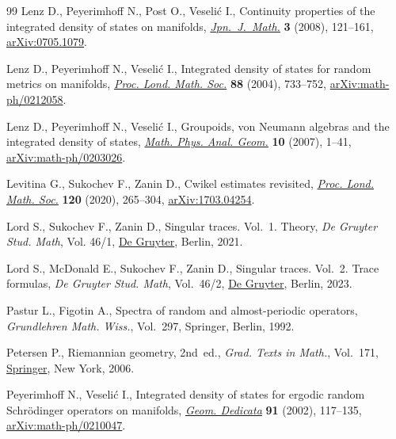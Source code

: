 \documentclass[pdftex]{sigma}
\numberwithin{equation}{section}
\begin{document}
\begin{thebibliography}{99}
Lenz D., Peyerimhoff N., Post O., Veseli\'c I., Continuity properties of the
 integrated density of states on manifolds, \href{https://doi.org/10.1007/s11537-008-0729-4}{\textit{Jpn.~J.~Math.}} \textbf{3}
 (2008), 121--161, \href{https://arxiv.org/abs/0705.1079}{arXiv:0705.1079}.

Lenz D., Peyerimhoff N., Veseli\'c I., Integrated density of states for random
 metrics on manifolds, \href{https://doi.org/10.1112/S0024611503014576}{\textit{Proc. Lond. Math. Soc.}} \textbf{88} (2004),
 733--752, \href{https://arxiv.org/abs/math-ph/0212058}{arXiv:math-ph/0212058}.

Lenz D., Peyerimhoff N., Veseli\'c I., Groupoids, von {N}eumann algebras and
 the integrated density of states, \href{https://doi.org/10.1007/s11040-007-9019-2}{\textit{Math. Phys. Anal. Geom.}}
 \textbf{10} (2007), 1--41, \href{https://arxiv.org/abs/math-ph/0203026}{arXiv:math-ph/0203026}.

Levitina G., Sukochev F., Zanin D., Cwikel estimates revisited, \href{https://doi.org/10.1112/plms.12301}{\textit{Proc.
 Lond. Math. Soc.}} \textbf{120} (2020), 265--304, \href{https://arxiv.org/abs/1703.04254}{arXiv:1703.04254}.

Lord S., Sukochev F., Zanin D., Singular traces. {V}ol.~1. {T}heory, \textit{De
 Gruyter Stud. Math}, Vol. 46/1, \href{https://doi.org/10.1515/9783110378054-201}{De Gruyter}, Berlin, 2021.

Lord S., McDonald E., Sukochev F., Zanin D., Singular traces. {V}ol.~2. {T}race
 formulas, \textit{De Gruyter Stud. Math}, Vol.~46/2, \href{https://doi.org/10.1515/9783110700176}{De Gruyter}, Berlin,
 2023.

Pastur L., Figotin A., Spectra of random and almost-periodic operators,
 \textit{Grundlehren Math. Wiss.}, Vol.~297, Springer, Berlin, 1992.

Petersen P., Riemannian geometry, 2nd~ed., \textit{Grad. Texts in Math.}, Vol.~171, \href{https://doi.org/10.1007/978-0-387-29403-2}{Springer}, New York, 2006.

Peyerimhoff N., Veseli\'c I., Integrated density of states for ergodic random
 {S}chr\"odinger operators on manifolds, \href{https://doi.org/10.1023/A:1016222913877}{\textit{Geom. Dedicata}} \textbf{91}
 (2002), 117--135, \href{https://arxiv.org/abs/math-ph/0210047}{arXiv:math-ph/0210047}.


\end{thebibliography}
\end{document}

